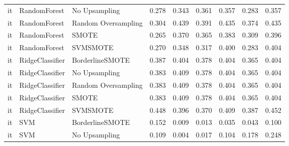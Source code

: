 \begin{tabular}{lllllllll}
      it &                 RandomForest &       No Upsampling & 0.278 &                     0.343 &                 0.361 &                  0.357 &                                   0.283 &     0.357 \\
      it &                 RandomForest & Random Oversampling & 0.304 &                     0.439 &                 0.391 &                  0.435 &                                   0.374 &     0.435 \\
      it &                 RandomForest &               SMOTE & 0.265 &                     0.370 &                 0.365 &                  0.383 &                                   0.309 &     0.396 \\
      it &                 RandomForest &            SVMSMOTE & 0.270 &                     0.348 &                 0.317 &                  0.400 &                                   0.283 &     0.404 \\
      it &              RidgeClassifier &     BorderlineSMOTE & 0.387 &                     0.404 &                 0.378 &                  0.404 &                                   0.365 &     0.404 \\
      it &              RidgeClassifier &       No Upsampling & 0.383 &                     0.409 &                 0.378 &                  0.404 &                                   0.365 &     0.404 \\
      it &              RidgeClassifier & Random Oversampling & 0.383 &                     0.409 &                 0.378 &                  0.404 &                                   0.365 &     0.404 \\
      it &              RidgeClassifier &               SMOTE & 0.383 &                     0.409 &                 0.378 &                  0.404 &                                   0.365 &     0.404 \\
      it &              RidgeClassifier &            SVMSMOTE & 0.448 &                     0.396 &                 0.370 &                  0.409 &                                   0.387 &     0.452 \\
      it &                          SVM &     BorderlineSMOTE & 0.152 &                     0.009 &                 0.013 &                  0.035 &                                   0.043 &     0.100 \\
      it &                          SVM &       No Upsampling & 0.109 &                     0.004 &                 0.017 &                  0.104 &                                   0.178 &     0.248 \\

\end{tabular}
